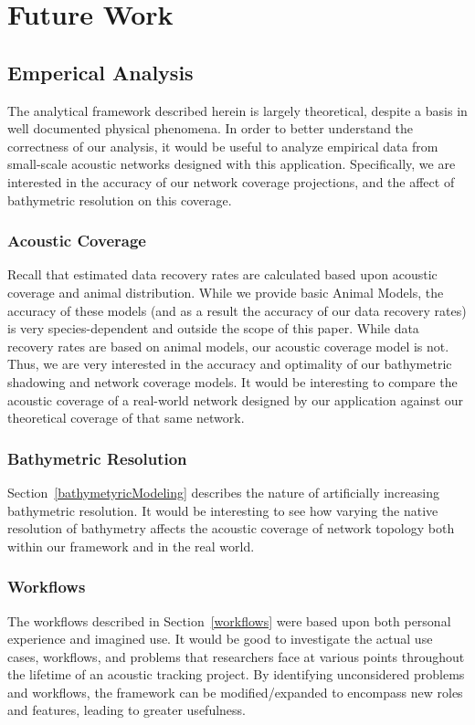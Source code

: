 \section{Future Work}
\subsection{Emperical Analysis}
The analytical framework described herein is largely theoretical, despite a basis in well documented physical phenomena.  In order to better understand the correctness of our analysis, it would be useful to analyze empirical data from small-scale acoustic networks designed with this application.  Specifically, we are interested in the accuracy of our network coverage projections, and the affect of bathymetric resolution on this coverage.  

\subsubsection{Acoustic Coverage}
Recall that estimated data recovery rates are calculated based upon acoustic coverage and animal distribution.  While we provide basic Animal Models, the accuracy of these models (and as a result the accuracy of our data recovery rates) is very species-dependent and outside the scope of this paper.  While data recovery rates are based on animal models, our acoustic coverage model is not.  Thus, we are very interested in the accuracy and optimality of our bathymetric shadowing and network coverage models.  It would be interesting to compare the acoustic coverage of a real-world network designed by our application against our theoretical coverage of that same network.

\subsubsection{Bathymetric Resolution}
Section~\ref{bathymetyricModeling} describes the nature of artificially increasing bathymetric resolution.  It would be interesting to see how varying the native resolution of bathymetry affects the acoustic coverage of network topology both within our framework and in the real world.

\subsubsection{Workflows}
The workflows described in Section~\ref{workflows} were based upon both personal experience and imagined use.  It would be good to investigate the actual use cases, workflows, and problems that researchers face at various points throughout the lifetime of an acoustic tracking project.  By identifying unconsidered problems and workflows, the framework can be modified/expanded to encompass new roles and features, leading to greater usefulness.

